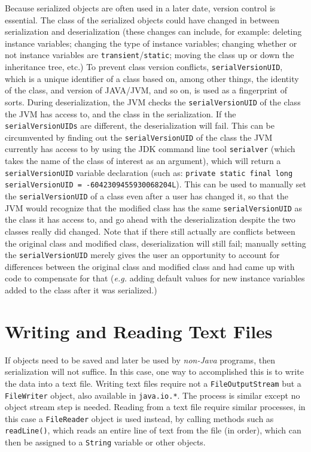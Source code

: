 \documentclass{tufte-handout}
\begin{document}
    Because serialized objects are often used in a later date, version control is essential. The class of the serialized objects could have changed in between serialization and deserialization (these changes can include, for example: deleting instance variables; changing the type of instance variables; changing whether or not instance variables are \texttt{transient}/\texttt{static}; moving the class up or down the inheritance tree, etc.) To prevent class version conflicts, \texttt{serialVersionUID}, which is a unique identifier of a class based on, among other things, the identity of the class, and version of JAVA/JVM, and so on, is used as a fingerprint of sorts. During deserialization, the JVM checks the \texttt{serialVersionUID} of the class the JVM has access to, and the class in the serialization. If the \texttt{serialVersionUIDs} are different, the deserialization will fail. This can be circumvented by finding out the \texttt{serialVersionUID} of the class the JVM currently has access to by using the JDK command line tool \texttt{serialver} (which takes the name of the class of interest as an argument), which will return a \texttt{serialVersionUID} variable declaration (such as: \texttt{private static final long serialVersionUID = -6042309455930068204L}). This can be used to manually set the \texttt{serialVersionUID} of a class even after a user has changed it, so that the JVM would recognize that the modified class has the same \texttt{serialVersionUID} as the class it has access to, and go ahead with the deserialization despite the two classes really did changed. Note that if there still actually are conflicts between the original class and modified class, deserialization will still fail; manually setting the \texttt{serialVersionUID} merely gives the user an opportunity to account for differences between the original class and modified class and had came up with code to compensate for that (\textit{e.g.} adding default values for new instance variables added to the class after it was serialized.)

    \section*{Writing and Reading Text Files}

    If objects need to be saved and later be used by \emph{non-Java} programs, then serialization will not suffice. In this case, one way to accomplished this is to write the data into a text file. Writing text files require not a \texttt{FileOutputStream} but a \texttt{FileWriter} object, also available in \texttt{java.io.*}. The process is similar except no object stream step is needed. Reading from a text file require similar processes, in this case a \texttt{FileReader} object is used instead, by calling methods such as \texttt{readLine()}, which reads an entire line of text from the file (in order), which can then be assigned to a \texttt{String} variable or other objects.
\end{document}
